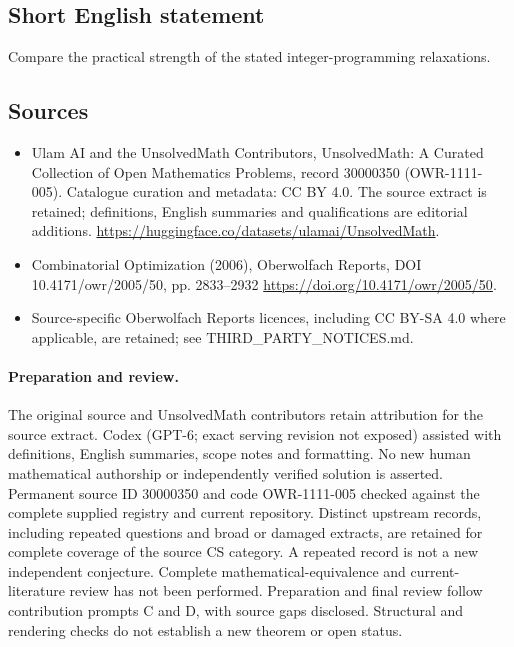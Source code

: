\documentclass[11pt]{article}
\begin{document}
\subsection{Short English statement}
Compare the practical strength of the stated integer-programming relaxations.
\subsection{Sources}
\begin{itemize}
\item[\hypertarget{source:30000350:1}{S1}] Ulam AI and the UnsolvedMath Contributors, UnsolvedMath: A Curated Collection of Open Mathematics Problems, record 30000350 (OWR-1111-005). Catalogue curation and metadata: CC BY 4.0. The source extract is retained; definitions, English summaries and qualifications are editorial additions.
\url{https://huggingface.co/datasets/ulamai/UnsolvedMath}.
\item[\hypertarget{source:30000350:2}{S2}] Combinatorial Optimization (2006), Oberwolfach Reports, DOI 10.4171/owr/2005/50, pp. 2833--2932
\url{https://doi.org/10.4171/owr/2005/50}.
\item Source-specific Oberwolfach Reports licences, including CC BY-SA 4.0 where applicable, are retained; see THIRD\_PARTY\_NOTICES.md.
\end{itemize}
\paragraph{Preparation and review.}
The original source and UnsolvedMath contributors retain attribution for the source extract. Codex (GPT-6; exact serving revision not exposed) assisted with definitions, English summaries, scope notes and formatting. No new human mathematical authorship or independently verified solution is asserted. Permanent source ID 30000350 and code OWR-1111-005 checked against the complete supplied registry and current repository. Distinct upstream records, including repeated questions and broad or damaged extracts, are retained for complete coverage of the source CS category. A repeated record is not a new independent conjecture. Complete mathematical-equivalence and current-literature review has not been performed. Preparation and final review follow contribution prompts C and D, with source gaps disclosed. Structural and rendering checks do not establish a new theorem or open status.
\label{end:30000350}
\end{document}
